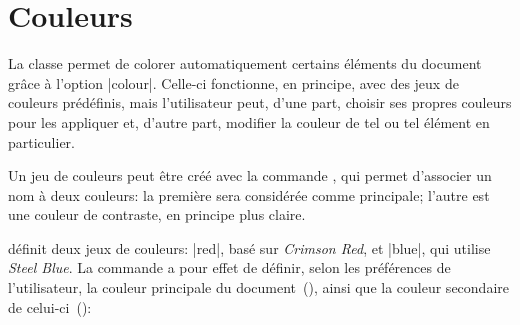 
\section{Couleurs}\label{Couleurs}

La classe \frenchlaw permet de colorer automatiquement certains éléments du document grâce à l'option |colour|. Celle-ci fonctionne, en principe, avec des jeux de couleurs prédéfinis, mais l'utilisateur peut, d'une part, choisir ses propres couleurs pour les appliquer et, d'autre part, modifier la couleur de tel ou tel élément en particulier.

\begin{noprint}
\newcommand{\setcolourscheme}[3]{%
	\expandafter\gdef\csname setmaincolour@#1\endcsname{\color[HTML]{#2}}%
	\expandafter\gdef\csname setsubcolour@#1\endcsname{\color[HTML]{#3}}}
\newcommand{\setcolours}[1]{%
	\gdef\maincolour{\csname setmaincolour@#1\endcsname}%
	\gdef\subcolour{\csname setsubcolour@#1\endcsname}}
\newcommand{\defaultcolour}{\color{black}}
\end{noprint}

\begin{developer}
Un jeu de couleurs peut être créé avec la commande , qui permet d'associer un nom à deux couleurs: la première sera considérée comme principale; l'autre est une couleur de contraste, en principe plus claire.\par
\vspace{-\baselineskip}
\begin{macro}
\end{macro}
\end{developer}

\begin{noprint}
\end{noprint}

\frenchlaw définit deux jeux de couleurs: |red|, basé sur \emph{Crimson Red}, et |blue|, qui utilise \emph{Steel Blue}. La commande  a pour effet de définir, selon les préférences de l'utilisateur, la couleur principale du document~(), ainsi que la couleur secondaire de celui-ci~():

